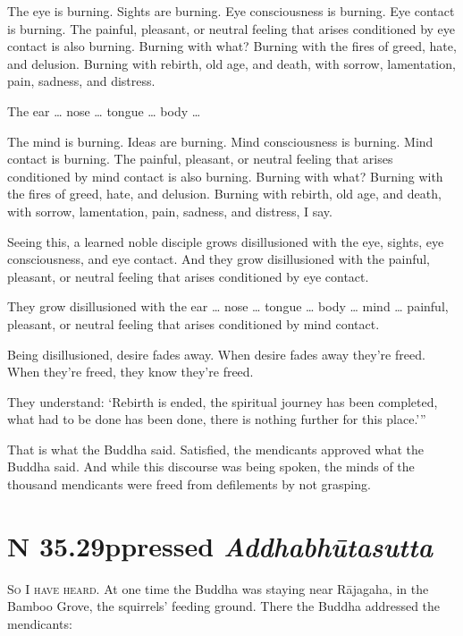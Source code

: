 \documentclass[12pt,openany]{book}%
\newcommand*{\suttatitleacronym}[1]{\smaller[2]{#1}\vspace*{.3em}}
\newcommand*{\suttatitletranslation}[1]{\linebreak{#1}}
\newcommand*{\suttatitleroot}[1]{\linebreak\smaller[2]\itshape{#1}}
\newcommand*{\tocacronym}[1]{\hspace*{-3.3em}{#1}\quad}
\newcommand*{\toctranslation}[1]{#1}
\newcommand*{\tocroot}[1]{(\textit{#1})}
\newcommand*{\scevam}[1]{\textsc{#1}}
\begin{document}
The eye is burning. Sights are burning. Eye consciousness is burning. Eye contact is burning. The painful, pleasant, or neutral feeling that arises conditioned by eye contact is also burning. Burning with what? Burning with the fires of greed, hate, and delusion. Burning with rebirth, old age, and death, with sorrow, lamentation, pain, sadness, and distress. 

The ear … nose … tongue … body … 

The mind is burning. Ideas are burning. Mind consciousness is burning. Mind contact is burning. The painful, pleasant, or neutral feeling that arises conditioned by mind contact is also burning. Burning with what? Burning with the fires of greed, hate, and delusion. Burning with rebirth, old age, and death, with sorrow, lamentation, pain, sadness, and distress, I say. 

Seeing this, a learned noble disciple grows disillusioned with the eye, sights, eye consciousness, and eye contact. And they grow disillusioned with the painful, pleasant, or neutral feeling that arises conditioned by eye contact. 

They grow disillusioned with the ear … nose … tongue … body … mind … painful, pleasant, or neutral feeling that arises conditioned by mind contact. 

Being disillusioned, desire fades away. When desire fades away they’re freed. When they’re freed, they know they’re freed. 

They understand: ‘Rebirth is ended, the spiritual journey has been completed, what had to be done has been done, there is nothing further for this place.’” 

That is what the Buddha said. Satisfied, the mendicants approved what the Buddha said. And while this discourse was being spoken, the minds of the thousand mendicants were freed from defilements by not grasping. 

%
\section*{{\suttatitleacronym SN 35.29}{\suttatitletranslation Oppressed }{\suttatitleroot Addhabhūtasutta}}
\addcontentsline{toc}{section}{\tocacronym{SN 35.29} \toctranslation{Oppressed } \tocroot{Addhabhūtasutta}}

\scevam{So I have heard. }At one time the Buddha was staying near \textsanskrit{Rājagaha}, in the Bamboo Grove, the squirrels’ feeding ground. There the Buddha addressed the mendicants: 
\end{document}

